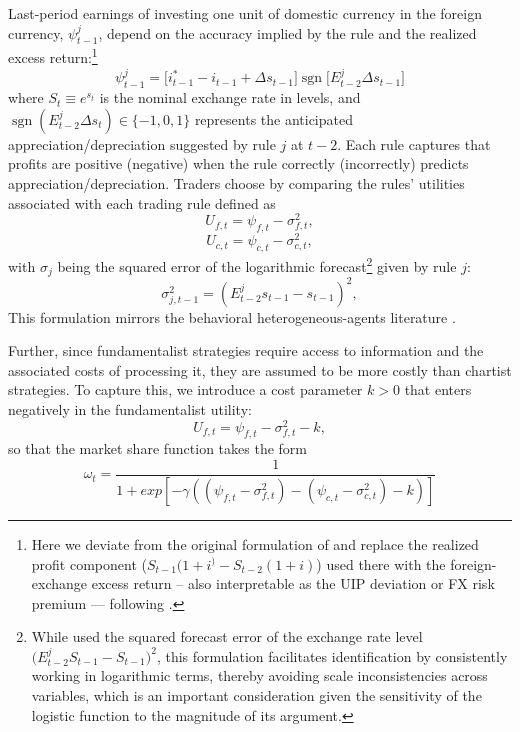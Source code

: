 \documentclass[a4paper,10pt,final]{article}    %
\begin{document}
Last-period earnings of investing one unit of domestic currency in the foreign currency, $\psi^{j}_{t-1}$, depend on the accuracy implied by the rule and the realized excess return:\footnote{Here we deviate from the original formulation of \citet{Proano2011,Proano2011} and replace the realized profit component ($S_{t-1}(1+i^) - S_{t-2}(1+i)$) used there with the foreign-exchange excess return -- also interpretable as the UIP deviation or FX risk premium --- following \citet{Engel2014}.}
\begin{equation}
    \psi^{j}_{t-1}
    = \bigl[i^*_{t-1} - i_{t-1} + \Delta s_{t-1} \bigr]
    \operatorname{sgn}\bigl[E^{j}_{t-2}\Delta s_{t-1}\bigr]
    \label{eq:psi}
\end{equation}
where $S_t \equiv e^{s_t}$ is the nominal exchange rate in levels, and $\operatorname{sgn}(E^{j}_{t-2}\Delta s_t)\in\{-1,0,1\}$ represents the anticipated appreciation/depreciation suggested by rule $j$ at $t-2$. Each rule captures that profits are positive (negative) when the rule correctly (incorrectly) predicts appreciation/depreciation. Traders choose by comparing the rules' utilities associated with each trading rule defined as
\[
    U_{f,t}=\psi_{f,t} - \sigma^2_{f,t},
\]
\[
    U_{c,t} = \psi_{c,t} - \sigma^2_{c,t},
\]
with $\sigma_j$ being the squared error of the logarithmic forecast\footnote{While \citet{Proano2011,proano2013monetary} used the squared forecast error of the exchange rate level $\bigl(E^{j}_{t-2}S_{t-1}-S_{t-1}\bigr)^{2}$, this formulation facilitates identification by consistently working in logarithmic terms, thereby avoiding scale inconsistencies across variables, which is an important consideration given the sensitivity of the logistic function to the magnitude of its argument.} given by rule $j$:
\begin{equation}
    \sigma^{2}_{j,t-1} = (E_{t-2}^j s_{t-1} - s_{t-1})^2,
    \label{eq:sigma}
\end{equation}
This formulation mirrors the behavioral heterogeneous-agents literature \citep{DeGrauwe2006,Hommes2013}.

Further, since fundamentalist strategies require access to information and the associated costs of processing it, they are assumed to be more costly than chartist strategies. To capture this, we introduce a cost parameter $k > 0$ that enters negatively in the fundamentalist utility:
\[
    U_{f,t}= \psi_{f,t} - \sigma^2_{f,t} -k,
\]
so that the market share function takes the form
\begin{equation}
    \label{eq:omega_k}
    \omega_t = \frac{1}{1+exp[-\gamma ((\psi_{f,t} - \sigma^2_{f,t}) - (\psi_{c,t} - \sigma^2_{c,t})  -k)]}
\end{equation}
\end{document}
